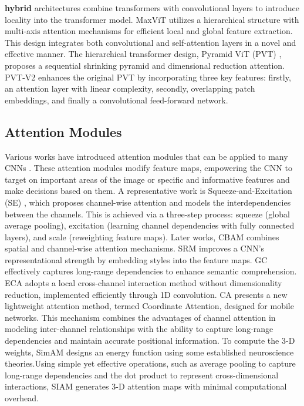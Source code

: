 \textbf{hybrid} architectures combine transformers with convolutional layers to introduce locality into the transformer model. MaxViT \cite{tu2022maxvit} utilizes a hierarchical structure with multi-axis attention mechanisms for efficient local and global feature extraction. This design integrates both convolutional and self-attention layers in a novel and effective manner. The hierarchical transformer design, Pyramid ViT (PVT) \cite{wang2021pyramid}, proposes a sequential shrinking pyramid and dimensional reduction attention. PVT-V2 enhances the original PVT by incorporating three key features: firstly, an attention layer with linear complexity, secondly, overlapping patch embeddings, and finally a convolutional feed-forward network.

\subsection{Attention Modules}

Various works have introduced attention modules that can be applied to many CNNs \cite{manzari2024befunet, saadati2023dilated}. These attention modules modify feature maps, empowering the CNN to target on important areas of the image or specific and informative features and make decisions based on them. A representative work is Squeeze-and-Excitation (SE) \cite{hu2018squeeze}, which proposes channel-wise attention and models the interdependencies between the channels. This is achieved via a three-step process: squeeze (global average pooling), excitation (learning channel dependencies with fully connected layers), and scale (reweighting feature maps). Later works, CBAM \cite{woo2018cbam} combines spatial and channel-wise attention mechanisms. SRM \cite{lee2019srm} improves a CNN's representational strength by embedding styles into the feature maps. GC \cite{cao2020global} effectively captures long-range dependencies to enhance semantic comprehension. ECA \cite{wang2020eca} adopts a local cross-channel interaction method without dimensionality reduction, implemented efficiently through 1D convolution. CA \cite{hou2021coordinate} presents a new lightweight attention method, termed Coordinate Attention, designed for mobile networks. This mechanism combines the advantages of channel attention in modeling inter-channel relationships with the ability to capture long-range dependencies and maintain accurate positional information. To compute the 3-D weights, SimAM \cite{yang2021simam} designs an energy function using some established neuroscience theories.Using simple yet effective operations, such as average pooling to capture long-range dependencies and the dot product to represent cross-dimensional interactions, SIAM \cite{han2024siam} generates 3-D attention maps with minimal computational overhead.